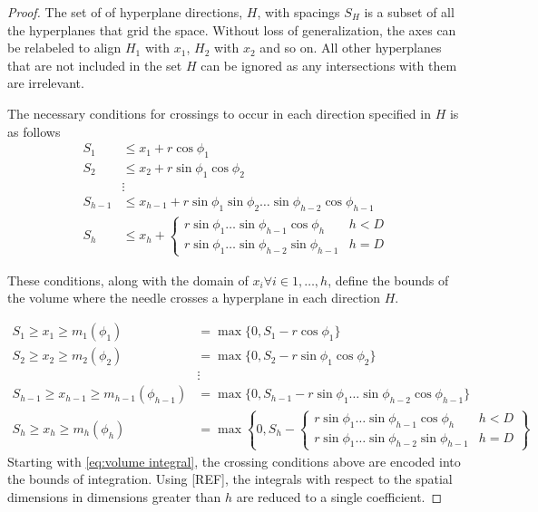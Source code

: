 \documentclass{article}
\begin{document}
\begin{proof}
	The set of of hyperplane directions, $H$, with spacings $S_H$ is a subset of all the 
	hyperplanes that grid the space. Without loss of generalization, the axes can be relabeled to
	align $H_1$ with $x_1$, $H_2$ with $x_2$ and so on. All other hyperplanes that are not included
	in the set $H$ can be ignored as any intersections with them are irrelevant.

	The necessary conditions for crossings to occur in each direction specified in $H$ is as follows
	\begin{align}
		S_1 &\le x_1 + r\cos\phi_1\\
		S_2 &\le x_2 + r\sin\phi_1\cos\phi_2\\
		&\vdots \\
		S_{h-1} &\le x_{h-1} + r\sin\phi_1\sin\phi_2\hdots\sin\phi_{h-2}\cos\phi_{h-1}\\
		S_{h} &\le x_h + \begin{cases}
			r\sin\phi_1\hdots\sin\phi_{h-1}\cos\phi_{h} & h < D \\
			r\sin\phi_1\hdots\sin\phi_{h-2}\sin\phi_{h-1} & h = D
		\end{cases}
	\end{align}

	These conditions, along with the domain of $x_i \forall i\in {1,\hdots,h}$, define the bounds of the
	volume where the needle crosses a hyperplane in each direction $H$.
	
	\begin{align}
		S_1 \ge x_1 \ge m_1(\phi_1) &= \max\{0, S_1-r\cos\phi_1\}\\
		S_2 \ge x_2 \ge m_2(\phi_2) &= \max\{0, S_2-r\sin\phi_1\cos\phi_2\}\\
		&\vdots \\
		S_{h-1} \ge x_{h-1} \ge m_{h-1}(\phi_{h-1}) &= \max\{0, S_{h-1}-r\sin\phi_1\hdots\sin\phi_{h-2}\cos\phi_{h-1}\}\\
		S_h \ge x_h \ge m_{h}(\phi_{h}) &= \max\left\{0, S_h - \begin{cases}
			r\sin\phi_1\hdots\sin\phi_{h-1}\cos\phi_{h} & h < D\\
			r\sin\phi_1\hdots\sin\phi_{h-2}\sin\phi_{h-1} & h = D
		\end{cases} \right\}
	\end{align}
	Starting with \ref{eq:volume integral}, the crossing conditions above are encoded into
	the bounds of integration. Using [REF], the integrals with respect to the
	spatial dimensions in dimensions greater than $h$ are reduced to a single coefficient.


\end{proof}
\end{document}
